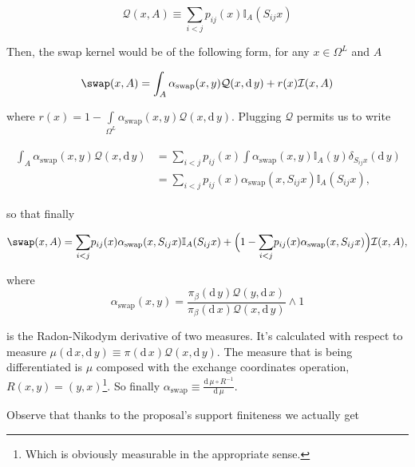 \begin{equation*}
	\mathcal{Q}(x, A) \equiv \underset{i < j}{\sum} p_{ij}(x) \mathbb{I}_A (S_{ij} x)
\end{equation*}	 

	Then, the swap kernel would be of the following form, for any $x \in \Omega^L$ and $A$
	
\begin{equation*}
	\swap(x,A) = \int_{A} \alpha_\text{swap} (x,y) \mathcal{Q}(x, \mathrm{d}\,y) + r(x) \mathcal{I}(x,A)
\end{equation*}	
	
	where $r(x) = 1 - \underset{\Omega^L}{\int} \alpha_\text{swap} (x,y) \mathcal{Q}(x, \mathrm{d}\,y) $. Plugging $\mathcal{Q}$ permits us to write
	
\begin{align*}
	\begin{split}
	\int_{A} \alpha_\text{swap} (x,y) \mathcal{Q}(x, \mathrm{d}\,y) &= \underset{ i < j}{\sum} p_{ij}(x) \int \alpha_\text{swap} (x,y) \mathbb{I}_A (y) \delta_{S_{ij}x}(\mathrm{d}\, y) \\ &= \underset{ i < j}{\sum} p_{ij}(x) \alpha_\text{swap} (x, S_{ij}x) \mathbb{I}_A(S_{ij} x),
	\end{split}
\end{align*}	

	so that finally
	
\begin{equation*}
	\swap(x,A) = \underset{ i < j}{\sum} p_{ij}(x) \alpha_\text{swap} (x, S_{ij}x) \mathbb{I}_A(S_{ij} x) + \Big( 1 - \underset{ i < j}{\sum} p_{ij}(x) \alpha_\text{swap} (x, S_{ij}x)\Big) \mathcal{I}(x,A),
\end{equation*}	
	
	where 
$$\alpha_\text{swap}(x,y) = \frac{\pi_\beta( \mathrm{d}\, y ) \mathcal{Q}(y, \mathrm{d}\,x)}{\pi_\beta( \mathrm{d}\, x ) \mathcal{Q}(x, \mathrm{d}\,y)} \wedge 1$$

 is the Radon-Nikodym derivative of two measures. It's calculated with respect to measure $ \mu (\mathrm{d}\,x, \mathrm{d}\,y) \equiv \pi(\mathrm{d}\,x) \mathcal{Q}(x, \mathrm{d}\,y)$. The measure that is being differentiated is $\mu$ composed with the exchange coordinates operation, $R(x,y) = (y,x)$\footnote{Which is obviously measurable in the appropriate sense.}. So finally $\alpha_\text{swap} \equiv \frac{\mathrm{d}\, \mu \circ R^{-1}}{\mathrm{d}\, \mu}$.
	
	Observe that thanks to the proposal's support finiteness we actually get 
	
